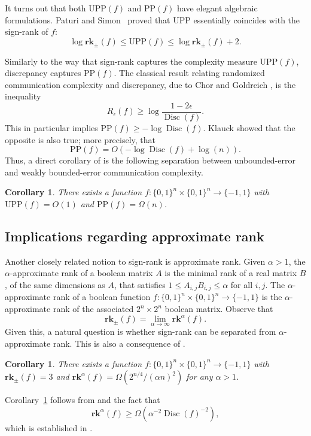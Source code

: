 \documentclass[11pt]{article}
\numberwithin{equation}{section}
\newtheorem{corollary}[theorem]{Corollary}
\theoremstyle{definition}
\theoremstyle{plain}
\theoremstyle{definition}\newtheorem{problem}[theorem]{Problem}\theoremstyle{plain}
\DeclareMathOperator{\Disc}{Disc}
\newcommand{\srk}{\mathbf{rk}_{\pm}}   %
\newcommand{\rk}{\mathbf{rk}}          %
\newcommand{\UPP}{\mathrm{UPP}}
\newcommand{\calPP}{\mathrm{PP}}
\begin{document}
It turns out that both $\UPP(f)$ and $\calPP(f)$  have elegant algebraic formulations. Paturi and Simon~\cite{paturi1986probabilistic} proved that $\UPP$ essentially coincides with the sign-rank of $f$:
$$\log \srk (f) \le \UPP(f) \le \log \srk (f)+2.$$

%
Similarly  %
to the way that sign-rank captures the complexity measure $\UPP(f)$, discrepancy captures $\calPP(f)$. The classical result relating randomized communication complexity and discrepancy, due to Chor and Goldreich  \cite{chor1988unbiased}, is the inequality
%
$$
R_{\epsilon}(f) \ge \log  \frac{1-2 \epsilon}{\Disc(f)}.
$$
This in particular implies $\calPP(f) \ge  -\log\Disc(f)$.
Klauck \cite{klauck2001lower}  showed that the opposite is also true; more precisely, that
$$\calPP(f)=O\left( - \log \Disc(f) + \log(n)\right). $$
Thus, a direct corollary of  is the following separation between unbounded-error and weakly bounded-error communication complexity.

\begin{corollary}\label{cor:separation}
There exists a  function $f:\{0,1\}^n \times \{0,1\}^n \to \{-1,1\}$ with $\UPP(f) = O(1)$ and $\calPP(f) = \Omega(n)$.
\end{corollary}



\subsection{Implications regarding approximate rank}
Another closely related notion to sign-rank is approximate rank. Given $\alpha > 1$, the $\alpha$-approximate rank of a boolean matrix $A$
is the minimal rank of a real matrix $B$, of the same dimensions as $A$, that satisfies $1 \le A_{i,j} B_{i,j} \le \alpha$ for all $i,j$.
The $\alpha$-approximate rank of a boolean function $f:\{0,1\}^n \times \{0,1\}^n \to \{-1,1\}$ is the $\alpha$-approximate rank of the associated $2^n \times 2^n$ boolean matrix. Observe that
$$\srk(f) = \lim_{\alpha\to\infty} \rk^\alpha(f).$$
Given this, a natural question is whether sign-rank can be separated from $\alpha$-approximate rank.
%
This is also a consequence of .
\begin{corollary}\label{cor:approxrank}
There exists a  function $f:\{0,1\}^n \times \{0,1\}^n \to \{-1,1\}$ with $\srk(f) = 3$ and $\rk^{\alpha}(f) = \Omega(2^{n/4} / (\alpha n)^2)$ for any $\alpha> 1$.
\end{corollary}
Corollary~\ref{cor:approxrank} follows from  and the fact that
$$\rk^{\alpha}(f) \geq \Omega\left(\alpha^{-2}\Disc(f)^{-2}\right),$$
which is established in %
\cite[Equation (1)]{gal-syed}.
\end{document}
